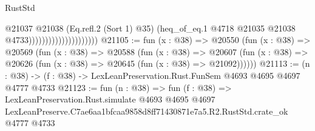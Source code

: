 \begin{lexlean}{RustStd}
\begin{coremodule}
                                          @21037
                                            @21038
                                            (Eq.refl.{2} (Sort 1) @35)
                                            (heq_of_eq.{1}
                                              @4718
                                              @21035
                                              @21038
                                              @4733)))))))))))))))))))))
@21105 := fun (x : @38) =>
  @20550
    (fun (x : @38) =>
    @20569
      (fun (x : @38) =>
      @20588
        (fun (x : @38) =>
        @20607 (fun (x : @38) => @20626 (fun (x : @38) => @20645 (fun (x : @38) => @21092))))))
@21113 := (n : @38) -> (f : @38) -> LexLeanPreservation.Rust.FunSem @4693 @4695 @4697 @4777 @4733
@21123 := fun (n : @38) =>
  fun (f : @38) =>
  LexLeanPreservation.Rust.simulate
    @4693
    @4695
    @4697
    LexLeanPreserve.C7ae6aa1bfcaa9858d8ff71430871e7a5.R2.RustStd.crate_ok
    @4777
    @4733
\end{coremodule}
\end{lexlean}
